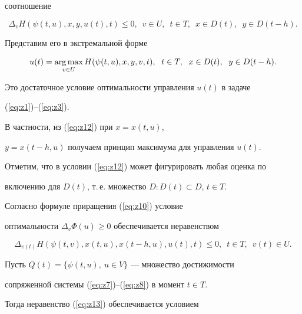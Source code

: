 соотношение


$$


\Delta_v H(\psi(t,u),x,y,u(t),t)\leq 0,\ \;v\in U,\ \;t\in T,\ \;x\in


D(t),\ \;y\in D(t-h).


$$


Представим его в экстремальной форме


\begin{equation}


u(t)=\argmax_{v\in U}H(\psi(t,u),x,y,v,t),


\ \;t\in T,\ \;x\in D(t),\ \;y\in D(t-h).


\label{eq:z12}


\end{equation}


Это достаточное условие оптимальности управления $u(t)$ в задаче


(\ref{eq:z1})--(\ref{eq:z3}).


В частности, из (\ref{eq:z12}) при $x=x(t,u)$,


$y=x(t-h,u)$ получаем принцип максимума для управления $u(t)$.





Отметим, что в условии (\ref{eq:z12}) может фигурировать любая оценка по


включению для $D(t)$, т.\,е. множество $D:D(t)\subset D$, $t\in T$.





Согласно формуле приращения (\ref{eq:z10}) условие


оптимальности $\Delta_v\Phi(u)\geq 0$ обеспечивается неравенством


\begin{equation}


\Delta_{v(t)}H(\psi(t,v),x(t,u),x(t-h,u),u(t),t)


\leq 0,\ \;t\in T,\ \;v(t)\in U.


\label{eq:z13}


\end{equation}





Пусть $Q(t)=\{ \psi(t,u),\ u\in V\}$ --- множество достижимости 


сопряженной системы (\ref{eq:z7})--(\ref{eq:z8}) в момент $t\in T$.


Тогда неравенство (\ref{eq:z13}) обеспечивается условием



